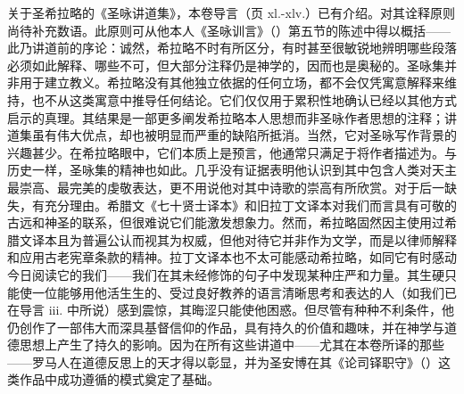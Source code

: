 关于圣希拉略的《圣咏讲道集》，本卷导言（页 xl.-xlv.）已有介绍。对其诠释原则尚待补充数语。此原则可从他本人《圣咏训言》（）第五节的陈述中得以概括——此乃讲道前的序论：诚然，希拉略不时有所区分，有时甚至很敏锐地辨明哪些段落必须如此解释、哪些不可，但大部分注释仍是神学的，因而也是奥秘的。圣咏集并非用于建立教义。希拉略没有其他独立依据的任何立场，都不会仅凭寓意解释来维持，也不从这类寓意中推导任何结论。它们仅仅用于累积性地确认已经以其他方式启示的真理。其结果是一部更多阐发希拉略本人思想而非圣咏作者思想的注释；讲道集虽有伟大优点，却也被明显而严重的缺陷所抵消。当然，它对圣咏写作背景的兴趣甚少。在希拉略眼中，它们本质上是预言，他通常只满足于将作者描述为。与历史一样，圣咏集的精神也如此。几乎没有证据表明他认识到其中包含人类对天主最崇高、最完美的虔敬表达，更不用说他对其中诗歌的崇高有所欣赏。对于后一缺失，有充分理由。希腊文《七十贤士译本》和旧拉丁文译本对我们而言具有可敬的古远和神圣的联系，但很难说它们能激发想象力。然而，希拉略固然因主使用过希腊文译本且为普遍公认而视其为权威，但他对待它并非作为文学，而是以律师解释和应用古老宪章条款的精神。拉丁文译本也不太可能感动希拉略，如同它有时感动今日阅读它的我们——我们在其未经修饰的句子中发现某种庄严和力量。其生硬只能使一位能够用他活生生的、受过良好教养的语言清晰思考和表达的人（如我们已在导言 iii. 中所说）感到震惊，其晦涩只能使他困惑。但尽管有种种不利条件，他仍创作了一部伟大而深具基督信仰的作品，具有持久的价值和趣味，并在神学与道德思想上产生了持久的影响。因为在所有这些讲道中——尤其在本卷所译的那些——罗马人在道德反思上的天才得以彰显，并为圣安博在其《论司铎职守》（）这类作品中成功遵循的模式奠定了基础。\par

